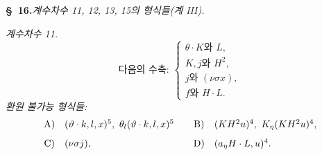 
\begin{center}
\textbf{\S\ 16.}\quad\emph{계수차수 11, 12, 13, 15의 형식들(계 III).}
\end{center}

\noindent\emph{계수차수 11.}
\[
\text{다음의 수축: }\left\{\begin{array}{l}
\theta\cdot K\text{와 }L,\\
K,j\text{와 }H^2,\\
j\text{와 }(\nu\sigma x),\\
f\text{와 }H\cdot L.
\end{array}\right.
\]
\noindent\emph{환원 불가능 형식들:}
\[
\begin{array}{c@{\quad}l@{\qquad}c@{\quad}l}
\text{A)}&(\vartheta\cdot k,l,x)^5,
\ \theta_l(\vartheta\cdot k,l,x)^5&
\text{B)}&(KH^2u)^4,
\ K_\eta(KH^2u)^4,\\[0.8em]
\text{C)}&(\nu\sigma j),&
\text{D)}&(a_\eta H\cdot L,u)^4.
\end{array}
\]
